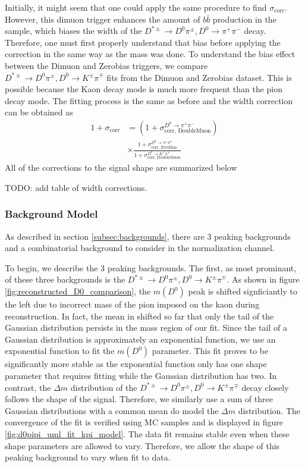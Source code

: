 Initially, it might seem that one could apply the same procedure to find $\sigma_{\text{corr}}$. However, this dimuon trigger enhances the amount of $b\bar{b}$ production in the sample, which biases the width of the $D^{*\pm}\to D^0 \pi^\pm, D^0 \to \pi^+ \pi^-$ decay. Therefore, one must first properly understand that bias before applying the correction in the same way as the mass was done. To understand the bias effect between the Dimuon and Zerobias triggers, we compare $D^{*\pm}\to D^0 \pi^\pm, D^0 \to K^\pm \pi^\mp$ fits from the Dimuon and Zerobias dataset. This is possible because the Kaon decay mode is much more frequent than the pion decay mode. The fitting process is the same as before and the width correction 
can be obtained as
\begin{equation}
    \begin{split}
        1+\sigma_{\text{corr}} &= \left(1+\sigma_{\text{corr, DoubleMuon}}^{D^0\to\pi^+\pi^-}\right) \\
        &\times \frac{
            1+\sigma_{\text{corr, ZeroBias}}^{D^0\to\pi^\pm\pi^\mp}
        }{
            1+\sigma_{\text{corr, DoubleMuon}}^{D^0\to K^\pm\pi^\mp}
        }
    \end{split}
\end{equation}    
All of the corrections to the signal shape are summarized below

TODO: add table of width corrections. 

\subsubsection{Background Model}

As described in section \ref{subsec:backgrounds}, there are 3 peaking backgrounds and a combinatorial background to consider in the normalization channel. 

To begin, we describe the 3 peaking backgrounds. The first, as most prominant, of these three backgrounds is the $D^{*\pm} \to D^0\pi^\pm, D^0 \to K^\pm \pi^\mp$. As shown in figure \ref{fig:reconstructed_D0_comparison}, the $m(D^0)$ peak is shifted signficiantly to the left due to incorrect mass of the pion imposed on the kaon during reconstruction. In fact, the mean in shifted so far that only the tail of the Gaussian distribution persists in the mass region of our fit. Since the tail of a Gaussian distribution is approximately an exponential function, we use an exponential function to fit the $m(D^0)$ parameter. This fit proves to be significantly more stable as the exponential function only has one shape parameter that requires fitting while the Gaussian distribution has two. In contrast, the $\Delta m$ distribution of the $D^{*\pm} \to D^0\pi^\pm, D^0 \to K^\pm \pi^\mp$ decay closely follows the shape of the signal. Therefore, we similarly use a sum of three Gaussian distributions with a common mean do model the $\Delta m$ distribution. The convergence of the fit is verified using MC samples and is displayed in figure \ref{fig:d0pipi_uml_fit_kpi_model}. The data fit remains stable even when these shape parameters are allowed to vary. Therefore, we allow the shape of this peaking background to vary when fit to data. 

